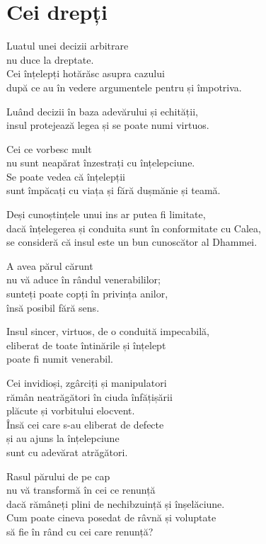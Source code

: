 
\chapter{Cei drepți}


Luatul unei decizii arbitrare\\
nu duce la dreptate.\\
Cei înțelepți hotărăsc asupra cazului\\
după ce au în vedere argumentele pentru și împotriva.


Luând decizii în baza adevărului și echității,\\
insul protejează legea și se poate numi virtuos.


Cei ce vorbesc mult\\
nu sunt neapărat înzestrați cu înțelepciune.\\
Se poate vedea că înțelepții\\
sunt împăcați cu viața și fără dușmănie și teamă.


Deși cunoștințele unui ins ar putea fi limitate,\\
dacă înțelegerea și conduita sunt în conformitate cu Calea,\\
se consideră că insul este un bun cunoscător al Dhammei.


A avea părul cărunt\\
nu vă aduce în rândul venerabililor;\\
sunteți poate copți în privința anilor,\\
însă posibil fără sens.


Insul sincer, virtuos, de o conduită impecabilă,\\
eliberat de toate întinările și înțelept\\
poate fi numit venerabil.


Cei invidioși, zgârciți și manipulatori\\
rămân neatrăgători în ciuda înfățișării\\
plăcute și vorbitului elocvent.\\
Însă cei care s-au eliberat de defecte\\
și au ajuns la înțelepciune\\
sunt cu adevărat atrăgători.


Rasul părului de pe cap\\
nu vă transformă în cei ce renunță\\
dacă rămâneți plini de nechibzuință și înșelăciune.\\
Cum poate cineva posedat de râvnă și voluptate\\
să fie în rând cu cei care renunță?


